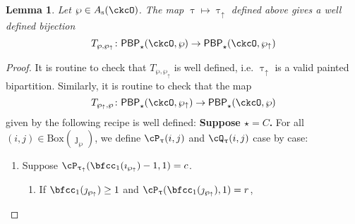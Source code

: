 \documentclass[12pt,a4paper]{amsart}
\def\Ass{A_{\mathrm{s}}}
\def\wpu{\wp_{\uparrow}}
\def\wpd{\wp} %
\def\uptauu{\uptau_{\uparrow}}
\def\uptaud{\uptau} %
\numberwithin{equation}{section}
\newtheorem{lem}[thm]{Lemma}
\theoremstyle{remark}
\newcommand{\BOX}[1]{\mathrm{Box}(#1)}
\def\PBP{\mathsf{PBP}}
\def\PBPop#1#2#3#4{\PBP_{#1}^{#2}(#3,#4)}
\newcommand{\PBPOP}[1][]{\PBPop{\star}{#1}{\ckcO}{\wp}}
\begin{document}
\begin{lem}\label{lem:sn}
  Let $\wp\in \Ass(\ckcO)$. The map $\uptau\mapsto \uptauu$ defined above
  gives a well defined
  bijection
  \[
    T_{\wp,\wpu}\colon \PBPOP \rightarrow
    \PBPop{\star}{}{\ckcO}{\wpu} %
  \]
\end{lem}
\begin{proof}
  It is routine to check that $T_{\wp,\wpu}$ is well defined, i.e. $\uptauu$ is a valid painted bipartition.
  Similarly, it is routine to check that the map
  \[
    T_{\wpu,\wp}\colon
    \PBPop{\star}{}{\ckcO}{\wpu} \rightarrow \PBPOP
  \]
  given by the following recipe is well defined:
  {\bfseries Suppose $\star = C$.}
  For all $(i,j)\in \BOX{\jmath_{\wpd}}$, we define $\cP_{\uptaud}(i,j)$ and $\cQ_{\uptaud}(i,j)$ case by
  case:
 \begin{enumerate}[label=(\alph*)]
   \item Suppose
   $\cP_{\uptauu}(\bfcc_{1}(\imath_{\wpu})-1,1)=c$.
   \begin{enumerate}[label={\localtextbulletone}]
     \item
           If $\bfcc_{1}(\jmath_{\wpu})\geq 1$ and
           $\cP_{\uptau}(\bfcc_{1}(\jmath_{\wpu}),1) = r$,


\end{enumerate}
\end{enumerate}
\end{proof}
\end{document}
